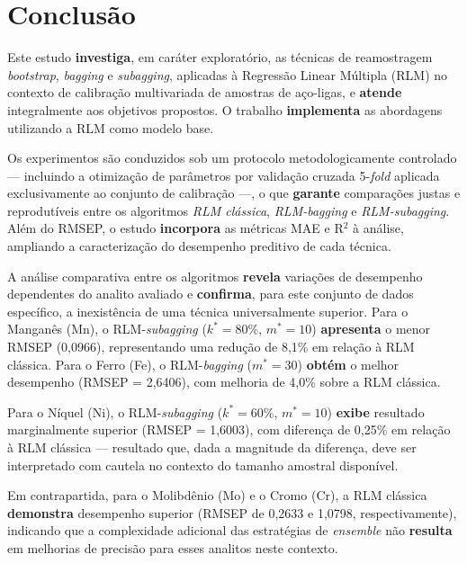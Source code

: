 \chapter{Conclusão}
\label{cha:conclusao}


Este estudo \textbf{investiga}, em caráter exploratório, as técnicas de 
reamostragem \textit{bootstrap}, \textit{bagging} e \textit{subagging}, 
aplicadas à Regressão Linear Múltipla (RLM) no contexto de calibração 
multivariada de amostras de aço-ligas, e \textbf{atende} integralmente 
aos objetivos propostos. %
O trabalho \textbf{implementa} as abordagens 
utilizando a RLM como modelo base.

Os experimentos são conduzidos sob 
um protocolo metodologicamente controlado --- incluindo a otimização de 
parâmetros por validação cruzada 5-\textit{fold} aplicada exclusivamente 
ao conjunto de calibração ---, o que \textbf{garante} comparações justas 
e reprodutíveis entre os algoritmos \textit{RLM clássica}, 
\textit{RLM-bagging} e \textit{RLM-subagging}. Além do RMSEP, o estudo 
\textbf{incorpora} as métricas \gls{MAE} e R$^2$ à análise, ampliando 
a caracterização do desempenho preditivo de cada técnica.


A análise comparativa entre os algoritmos \textbf{revela} variações de 
desempenho dependentes do analito avaliado e \textbf{confirma}, para 
este conjunto de dados específico, a inexistência de uma técnica 
universalmente superior. Para o Manganês 
(Mn), o RLM-\textit{subagging} ($k^* = 80\%$, $m^* = 10$) 
\textbf{apresenta} o menor RMSEP (0,0966), representando uma redução 
de 8,1\% em relação à RLM clássica. Para o Ferro (Fe), o 
RLM-\textit{bagging} ($m^* = 30$) \textbf{obtém} o melhor desempenho 
(RMSEP = 2,6406), com melhoria de 4,0\% sobre a RLM clássica.

Para o 
Níquel (Ni), o RLM-\textit{subagging} ($k^* = 60\%$, $m^* = 10$) 
\textbf{exibe} resultado marginalmente superior (RMSEP = 1,6003), com 
diferença de 0,25\% em relação à RLM clássica --- resultado que, dada 
a magnitude da diferença, deve ser interpretado com cautela no contexto 
do tamanho amostral disponível. %

Em contrapartida, para 
o Molibdênio (Mo) e o Cromo (Cr), a RLM clássica \textbf{demonstra} 
desempenho superior (RMSEP de 0,2633 e 1,0798, respectivamente), 
indicando que a complexidade adicional das estratégias de 
\textit{ensemble} não \textbf{resulta} em melhorias de precisão para 
esses analitos neste contexto.

